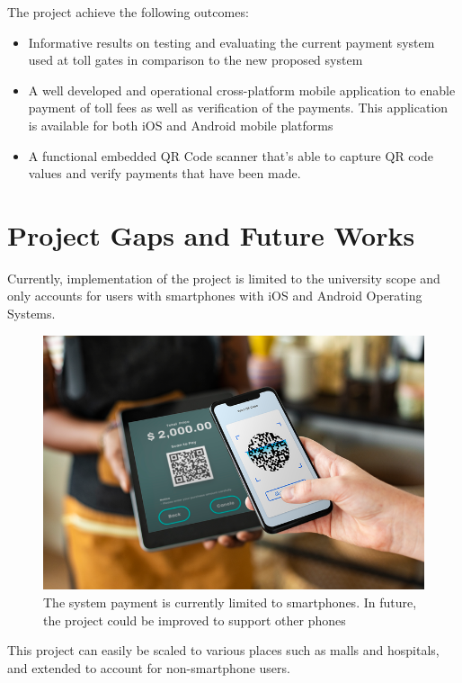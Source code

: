 The project achieve the following outcomes:
\begin{itemize}
    \item Informative results on testing and evaluating the current payment system used at toll gates in comparison to the new proposed system
    \item A well developed and operational cross-platform mobile application to enable payment of toll fees as well as verification of the payments. This application is available for both iOS and Android mobile platforms
    \item A functional embedded QR Code scanner that's able to capture QR code values and verify payments that have been made.

\end{itemize}


\section{Project Gaps and Future Works}
Currently, implementation of the project is limited to the university scope and only accounts for users with smartphones with iOS and Android Operating Systems.

\begin{figure}
    \begin{center}
        \includegraphics[scale = 1.3]{images/qr}
        \caption{The system payment is currently limited to smartphones. In future, the project could be improved to support other phones}
    \end{center}
\end{figure}
This project can easily be scaled to various places such as malls and hospitals, and extended to account for non-smartphone users.


